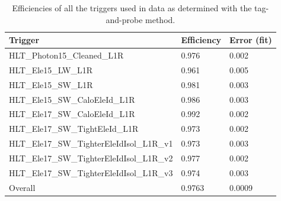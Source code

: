 



\begin{table}[htbp]
  \begin{center}
    \caption[Efficiencies of data trigger paths]{Efficiencies of all the triggers used in data as determined with the tag-and-probe method.}
    \label{TableTriggerEfficiencies}
    \begin{tabular}[]{ | l | l | l | }
      \hline
      Trigger	& Efficiency & Error (fit) \\ \hline \hline
      HLT\_Photon15\_Cleaned\_L1R & 0.976 & 0.002 \\ \hline
      HLT\_Ele15\_LW\_L1R & 0.961 & 0.005 \\ \hline
      HLT\_Ele15\_SW\_L1R & 0.981 & 0.003 \\ \hline
      HLT\_Ele15\_SW\_CaloEleId\_L1R & 0.986 & 0.003 \\ \hline
      HLT\_Ele17\_SW\_CaloEleId\_L1R & 0.992 & 0.002 \\ \hline
      HLT\_Ele17\_SW\_TightEleId\_L1R & 0.973 & 0.002 \\ \hline
      HLT\_Ele17\_SW\_TighterEleIdIsol\_L1R\_v1 & 0.973 & 0.003 \\ \hline
      HLT\_Ele17\_SW\_TighterEleIdIsol\_L1R\_v2 & 0.977 & 0.002 \\ \hline
      HLT\_Ele17\_SW\_TighterEleIdIsol\_L1R\_v3 & 0.974 & 0.003 \\ \hline
      Overall & 0.9763 & 0.0009 \\ \hline
    \end{tabular}
  \end{center}
\end{table}

\clearpage
